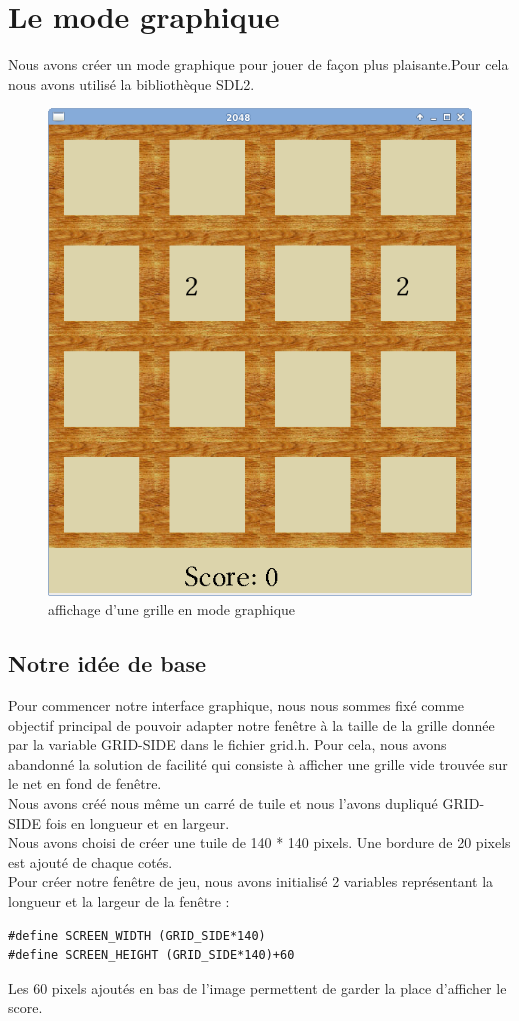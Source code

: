 \documentclass{report}
\begin{document}
\chapter{Le mode graphique}
Nous avons créer un mode graphique pour jouer de façon plus plaisante.Pour cela nous avons utilisé la bibliothèque SDL2.
\begin{figure}[hbtp]
\caption{affichage d'une grille en mode graphique}
\centering
\includegraphics[scale=0.3]{modegraphique.png}
\end{figure}
\section{Notre idée de base}
Pour commencer notre interface graphique, nous nous sommes fixé comme objectif principal de pouvoir adapter notre fenêtre à la taille de la grille donnée par la variable GRID-SIDE dans le fichier grid.h. Pour cela, nous avons abandonné la solution de facilité qui consiste à afficher une grille vide trouvée sur le net en fond de fenêtre.\\
Nous avons créé nous même un carré de tuile et nous l'avons dupliqué GRID-SIDE fois en longueur et en largeur.\\
Nous avons choisi de créer une tuile de 140 * 140 pixels. Une bordure de 20 pixels est ajouté de chaque cotés.\\
Pour créer notre fenêtre de jeu, nous avons initialisé 2 variables représentant la longueur et la largeur de la fenêtre :
\begin{lstlisting}[frame=single]
#define SCREEN_WIDTH (GRID_SIDE*140)
#define SCREEN_HEIGHT (GRID_SIDE*140)+60
\end{lstlisting}
Les 60 pixels ajoutés en bas de l'image permettent de garder la place d'afficher le score.\\
\end{document}
